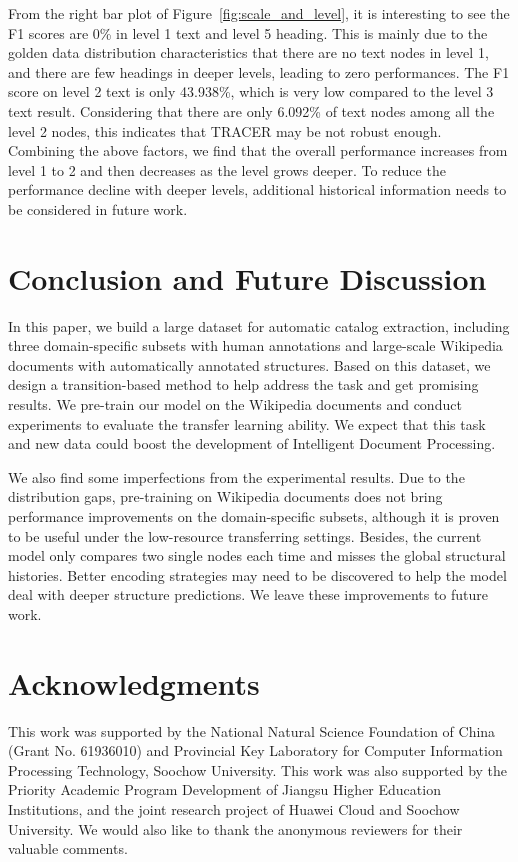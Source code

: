 \documentclass[runningheads]{llncs}
\begin{document}
From the right bar plot of Figure~\ref{fig:scale_and_level}, it is interesting to see the F1 scores are 0\% in level 1 text and level 5 heading.
This is mainly due to the golden data distribution characteristics that there are no text nodes in level 1, and there are few headings in deeper levels, leading to zero performances.
The F1 score on level 2 text is only 43.938\%, which is very low compared to the level 3 text result.
Considering that there are only 6.092\% of text nodes among all the level 2 nodes, this indicates that TRACER may be not robust enough.
Combining the above factors, we find that the overall performance increases from level 1 to 2 and then decreases as the level grows deeper.
To reduce the performance decline with deeper levels, additional historical information needs to be considered in future work.

 \section{Conclusion and Future Discussion}

In this paper, we build a large dataset for automatic catalog extraction, including three domain-specific subsets with human annotations and large-scale Wikipedia documents with automatically annotated structures.
Based on this dataset, we design a transition-based method to help address the task and get promising results.
We pre-train our model on the Wikipedia documents and conduct experiments to evaluate the transfer learning ability.
We expect that this task and new data could boost the development of Intelligent Document Processing.

We also find some imperfections from the experimental results.
Due to the distribution gaps, pre-training on Wikipedia documents does not bring performance improvements on the domain-specific subsets, although it is proven to be useful under the low-resource transferring settings.
Besides, the current model only compares two single nodes each time and misses the global structural histories.
Better encoding strategies may need to be discovered to help the model deal with deeper structure predictions.
We leave these improvements to future work.
 \section*{Acknowledgments}

This work was supported by the National Natural Science Foundation of China (Grant No. 61936010) and Provincial Key Laboratory for Computer Information Processing Technology, Soochow University.
This work was also supported by the Priority Academic Program Development of Jiangsu Higher Education Institutions, and the joint research project of Huawei Cloud and Soochow University.
We would also like to thank the anonymous reviewers for their valuable comments.
 




\end{document}
